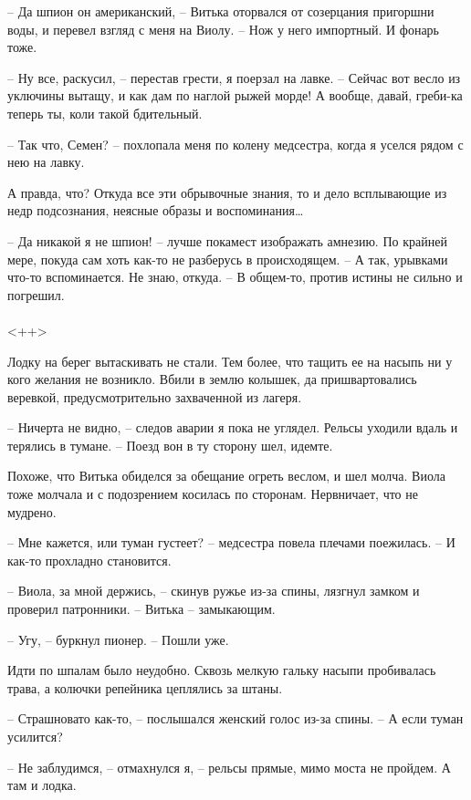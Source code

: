 \documentclass[a4paper]{book}
\begin{document}
-- Да шпион он американский, -- Витька оторвался от созерцания пригоршни воды, и перевел взгляд с меня на Виолу. -- Нож у него импортный. И фонарь тоже. 

-- Ну все, раскусил, -- перестав грести, я поерзал на лавке. -- Сейчас вот весло из уключины вытащу, и как дам по наглой рыжей морде! А вообще, давай, греби-ка теперь ты, коли такой бдительный.

-- Так  что, Семен? -- похлопала меня по колену медсестра, когда я уселся рядом с нею на лавку. 

А правда, что? Откуда все эти обрывочные знания, то и дело всплывающие из недр подсознания, неясные образы и воспоминания\ldots

-- Да никакой я не шпион! -- лучше покамест изображать амнезию. По крайней мере, покуда сам хоть как-то не разберусь в происходящем. -- А так, урывками что-то вспоминается. Не знаю, откуда. -- В общем-то, против истины не сильно и погрешил.

\paragraph{}<++>

Лодку на берег вытаскивать не стали. Тем более, что тащить ее на насыпь ни у кого желания не возникло. Вбили в землю колышек, да пришвартовались веревкой, предусмотрительно захваченной из лагеря.

-- Ничерта не видно, -- следов аварии я пока не углядел. Рельсы уходили вдаль и терялись в тумане. -- Поезд вон в ту сторону шел, идемте.

Похоже, что Витька обиделся за обещание огреть веслом, и шел молча. Виола тоже молчала и с подозрением косилась по сторонам. Нервничает, что не мудрено.  

-- Мне кажется, или туман густеет? -- медсестра повела плечами поежилась. -- И как-то прохладно становится.

-- Виола, за мной держись, -- скинув ружье из-за спины, лязгнул замком и проверил патронники. -- Витька -- замыкающим.

-- Угу, -- буркнул пионер. -- Пошли уже.

Идти по шпалам было неудобно. Сквозь мелкую гальку насыпи пробивалась трава, а колючки репейника цеплялись за штаны. 

-- Страшновато как-то, -- послышался женский голос из-за спины. -- А если туман усилится?

-- Не заблудимся, -- отмахнулся я, -- рельсы прямые, мимо моста не пройдем. А там и лодка. 
\end{document}
